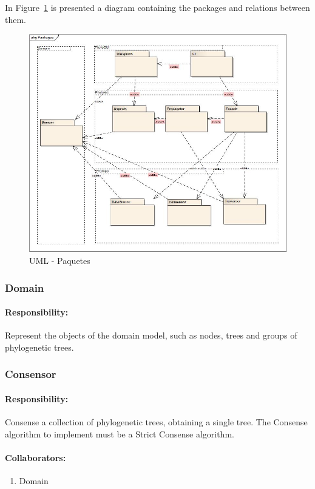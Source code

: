 \documentclass[a4paper,10pt]{article}
\begin{document}
In Figure~\ref{uml:packages} is presented a diagram containing the packages and relations between them.

  \begin{figure}
  \centering
  \includegraphics[scale=0.5]{images/Packages.jpg}  
  \caption{UML - Paquetes}
  \label{uml:packages}
  \end{figure}

\subsubsection{Domain}

\paragraph{Responsibility:} Represent the objects of the domain model, such as nodes, trees and groups of phylogenetic trees.

\subsubsection{Consensor}

\paragraph{Responsibility:} Consense a collection of phylogenetic trees, obtaining a single tree. The Consense algorithm to implement must be a Strict Consense algorithm.
\paragraph{Collaborators:}
      \begin{enumerate}
       \item Domain
      \end{enumerate}
\end{document}
